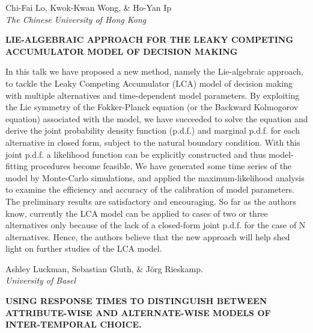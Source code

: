 \documentclass[]{article}
\begin{document}
Chi-Fai Lo, Kwok-Kwan Wong, \& Ho-Yan Ip\\
\emph{The Chinese University of Hong Kong}

\textbf{LIE-ALGEBRAIC APPROACH FOR THE LEAKY COMPETING ACCUMULATOR MODEL
OF DECISION MAKING}

In this talk we have proposed a new method, namely the Lie-algebraic
approach, to tackle the Leaky Competing Accumulator (LCA) model of
decision making with multiple alternatives and time-dependent model
parameters. By exploiting the Lie symmetry of the Fokker-Planck equation
(or the Backward Kolmogorov equation) associated with the model, we have
succeeded to solve the equation and derive the joint probability density
function (p.d.f.) and marginal p.d.f. for each alternative in closed
form, subject to the natural boundary condition. With this joint p.d.f.
a likelihood function can be explicitly constructed and thus
model-fitting procedures become feasible. We have generated some time
series of the model by Monte-Carlo simulations, and applied the
maximum-likelihood analysis to examine the efficiency and accuracy of
the calibration of model parameters. The preliminary results are
satisfactory and encouraging. So far as the authors know, currently the
LCA model can be applied to cases of two or three alternatives only
because of the lack of a closed-form joint p.d.f. for the case of N
alternatives. Hence, the authors believe that the new approach will help
shed light on further studies of the LCA model.\\
\pagebreak  

Ashley Luckman, Sebastian Gluth, \& Jörg Rieskamp.\\
\emph{University of Basel}

\textbf{USING RESPONSE TIMES TO DISTINGUISH BETWEEN ATTRIBUTE-WISE AND
ALTERNATE-WISE MODELS OF INTER-TEMPORAL CHOICE.}
\end{document}
